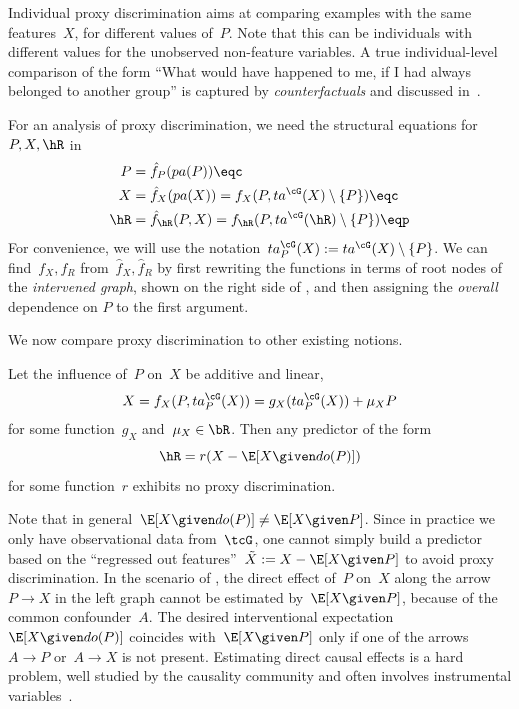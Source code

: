 Individual proxy discrimination aims at comparing examples with the same
features~$X$, for different values of~$P$. Note that this can be individuals
with different values for the unobserved non-feature variables. A true
individual-level comparison of the form ``What would have happened to me, if I
had always belonged to another group'' is captured by \emph{counterfactuals} and
discussed in~\cite{Kusner2017, Nabi2017}.

For an analysis of proxy discrimination, we need the structural equations
for~$P, X, \hR$ in 
\begin{subequations}
  \begin{align*}
    P &= \hat{f}_P (pa(P)) \eqc \\
    X &= \hat{f}_X (pa(X)) = f_X (P, ta^{\cG} (X) \setminus \{P\}) \eqc \\
    \hR &= \hat{f}_{\hR} (P, X) = f_{\hR} (P, ta^{\cG} (\hR) \setminus \{P\}) \eqp
  \end{align*}
\end{subequations}
For convenience, we will use the notation~$ta^{\cG}_{P}(X) := ta^{\cG} (X)
\setminus \{P\}$. We can find~$f_X, f_R$ from~$\hat{f}_X, \hat{f}_R$ by first
rewriting the functions in terms of root nodes of the \emph{intervened graph},
shown on the right side of , and then assigning the
\emph{overall} dependence on $P$ to the first argument.

We now compare proxy discrimination to other existing notions.

\begin{theorem}\label{thm:rvtodistr}
  Let the influence of~$P$ on~$X$ be additive and linear, \ie{}
  \begin{equation*}
    X = f_X (P, ta^{\cG}_P(X)) = g_X(ta^{\cG}_P(X)) + \mu_X P
  \end{equation*}
  for some function~$g_X$ and~$\mu_X \in \bR$. Then any predictor of the form
  \begin{equation*}
    \hR = r(X - \E [X \given do(P)])
  \end{equation*}
  for some function~$r$ exhibits no proxy discrimination.
\end{theorem}

Note that in general~$\E[X \given do(P)] \neq \E[X \given P]$. Since in practice
we only have observational data from~$\tcG$, one cannot simply build a
predictor based on the ``regressed out features''~$\tilde{X} := X - \E[X \given
P]$ to avoid proxy discrimination. In the scenario of
, the direct effect of~$P$ on~$X$ along the arrow~$P
\to X$ in the left graph cannot be estimated by~$\E[X \given P]$, because of
the common confounder~$A$. The desired interventional expectation~$\E[X \given
do(P)]$ coincides with~$\E[X \given P]$ only if one of the arrows~$A \to P$
or~$A \to X$ is not present. Estimating direct causal effects is a hard problem,
well studied by the causality community and often involves instrumental
variables~\cite{Angrist2001}.

